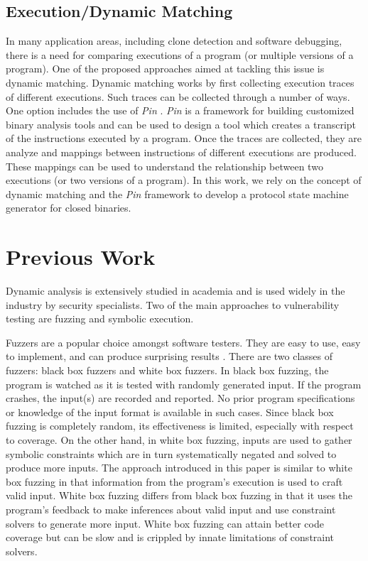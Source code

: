 \documentclass{acm_proc_article-sp}
\begin{document}
\subsection{Execution/Dynamic Matching} \label{bg_dynamicsim}
In many application areas, including clone detection and software debugging, there is a need for comparing executions of a program (or multiple versions of a program).
One of the proposed approaches aimed at tackling this issue is dynamic matching.
Dynamic matching works by first collecting execution traces of different executions.
Such traces can be collected through a number of ways.
One option includes the use of \textit{Pin} \cite{pintool}.
\textit{Pin} is a framework for building customized binary analysis tools and can be used to design a tool which creates a transcript of the instructions executed by a program.
Once the traces are collected, they are analyze and mappings between instructions of different executions are produced.
These mappings can be used to understand the relationship between two executions (or two versions of a program).
In this work, we rely on the concept of dynamic matching and the \textit{Pin} framework to develop a protocol state machine generator for closed binaries.


\section{Previous Work} \label{prevwork}
Dynamic analysis is extensively studied in academia and is used widely in the industry by security specialists.
Two of the main approaches to vulnerability testing are fuzzing and symbolic execution.

Fuzzers are a popular choice amongst software testers.
They are easy to use, easy to implement, and can produce surprising results \cite{millerfuzz, millerfuzzrevisited}.
There are two classes of fuzzers: black box fuzzers and white box fuzzers.
In black box fuzzing, the program is watched as it is tested with randomly generated input.
If the program crashes, the input(s) are recorded and reported.
No prior program specifications or knowledge of the input format is available in such cases.
Since black box fuzzing is completely random, its effectiveness is limited, especially with respect to coverage.
On the other hand, in white box fuzzing, inputs are used to gather symbolic constraints which are in turn systematically negated and solved to produce more inputs.
The approach introduced in this paper is similar to white box fuzzing in that information from the program's execution is used to craft valid input.
White box fuzzing differs from black box fuzzing in that it uses the program's feedback to make inferences about valid input and use constraint solvers to generate more input.
White box fuzzing can attain better code coverage but can be slow and is crippled by innate limitations of constraint solvers.
\end{document}
